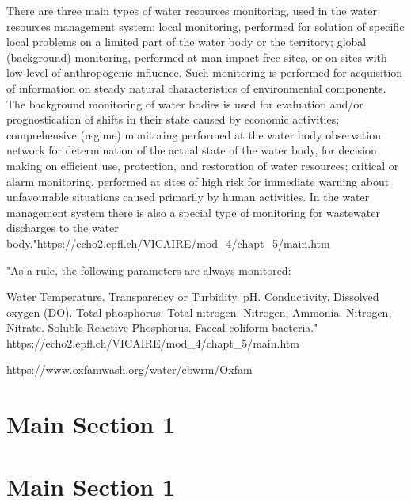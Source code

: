 There are three main types of water resources monitoring, used in the water resources management system:
local monitoring, performed for solution of specific local problems on a limited part of the water body or the territory;
global (background) monitoring, performed at man-impact free sites, or on sites with low level of anthropogenic influence. Such monitoring is performed for acquisition of information on steady natural characteristics of environmental components. The background monitoring of water bodies is used for evaluation and/or prognostication of shifts in their state caused by economic activities;
comprehensive (regime) monitoring performed at the water body observation network for determination of the actual state of the water body, for decision making on efficient use, protection, and restoration of water resources;
critical or alarm monitoring, performed at sites of high risk for immediate warning about unfavourable situations caused primarily by human activities.
In the water management system there is also a special type of monitoring for wastewater discharges to the water body."https://echo2.epfl.ch/VICAIRE/mod_4/chapt_5/main.htm

"As a rule, the following parameters are always monitored:

Water Temperature.
Transparency or Turbidity.
pH.
Conductivity.
Dissolved oxygen (DO).
Total phosphorus.
Total nitrogen.
Nitrogen, Ammonia.
Nitrogen, Nitrate.
Soluble Reactive Phosphorus.
Faecal coliform bacteria." https://echo2.epfl.ch/VICAIRE/mod_4/chapt_5/main.htm

https://www.oxfamwash.org/water/cbwrm/Oxfam%

\section{Main Section 1}


\section{Main Section 1}
